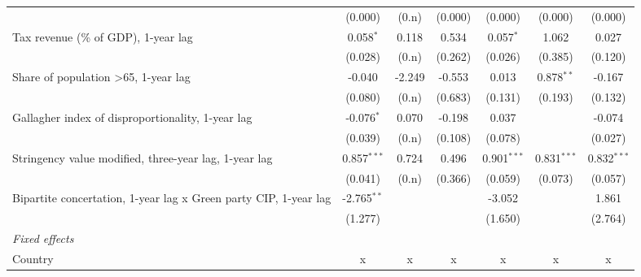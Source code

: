 \begin{table}[htbp]
\begin{tabular}{lcccccc}
                                                                       & (0.000)       & (0.n)                     & (0.000)        & (0.000)         & (0.000)         & (0.000)\\   
      Tax revenue (\% of GDP), 1-year lag                              & 0.058$^{*}$   & 0.118                     & 0.534          & 0.057$^{*}$     & 1.062           & 0.027\\   
                                                                       & (0.028)       & (0.n)                     & (0.262)        & (0.026)         & (0.385)         & (0.120)\\   
      Share of population >65, 1-year lag                              & -0.040        & -2.249                    & -0.553         & 0.013           & 0.878$^{**}$    & -0.167\\   
                                                                       & (0.080)       & (0.n)                     & (0.683)        & (0.131)         & (0.193)         & (0.132)\\   
      Gallagher index of disproportionality, 1-year lag                & -0.076$^{*}$  & 0.070                     & -0.198         & 0.037           &                 & -0.074\\   
                                                                       & (0.039)       & (0.n)                     & (0.108)        & (0.078)         &                 & (0.027)\\   
      Stringency value modified, three-year lag, 1-year lag            & 0.857$^{***}$ & 0.724                     & 0.496          & 0.901$^{***}$   & 0.831$^{***}$   & 0.832$^{***}$\\   
                                                                       & (0.041)       & (0.n)                     & (0.366)        & (0.059)         & (0.073)         & (0.057)\\   
      Bipartite concertation, 1-year lag x Green party CIP, 1-year lag & -2.765$^{**}$ &                           &                & -3.052          &                 & 1.861\\   
                                                                       & (1.277)       &                           &                & (1.650)         &                 & (2.764)\\   
      \emph{Fixed effects}\\
      Country                                                          & x             & x                         & x              & x               & x               & x\\  

\end{tabular}
\end{table}
